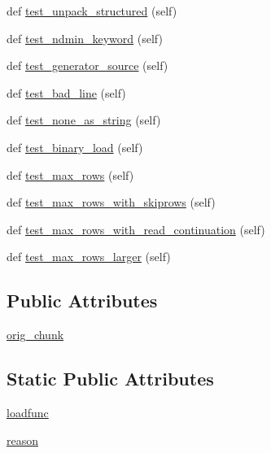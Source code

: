 \begin{DoxyCompactItemize}
\item 
def \hyperlink{classnumpy_1_1lib_1_1tests_1_1test__io_1_1TestLoadTxt_a16a39f122d202375a85138547c5bed27}{test\+\_\+unpack\+\_\+structured} (self)
\item 
def \hyperlink{classnumpy_1_1lib_1_1tests_1_1test__io_1_1TestLoadTxt_a3bf64793505e6c2caabbe46dced10c78}{test\+\_\+ndmin\+\_\+keyword} (self)
\item 
def \hyperlink{classnumpy_1_1lib_1_1tests_1_1test__io_1_1TestLoadTxt_a20a293919a71ebebbc4afced0261344f}{test\+\_\+generator\+\_\+source} (self)
\item 
def \hyperlink{classnumpy_1_1lib_1_1tests_1_1test__io_1_1TestLoadTxt_aae505bab6b100255e53b8520cf0c5a47}{test\+\_\+bad\+\_\+line} (self)
\item 
def \hyperlink{classnumpy_1_1lib_1_1tests_1_1test__io_1_1TestLoadTxt_ab2c3b9e38ecee2c6b18475986295a916}{test\+\_\+none\+\_\+as\+\_\+string} (self)
\item 
def \hyperlink{classnumpy_1_1lib_1_1tests_1_1test__io_1_1TestLoadTxt_a8e3459c741792d56e280295972697d3d}{test\+\_\+binary\+\_\+load} (self)
\item 
def \hyperlink{classnumpy_1_1lib_1_1tests_1_1test__io_1_1TestLoadTxt_a5f9db798413530df8dacf6ec4dae39ab}{test\+\_\+max\+\_\+rows} (self)
\item 
def \hyperlink{classnumpy_1_1lib_1_1tests_1_1test__io_1_1TestLoadTxt_aff6efdfa274eadf11bc1a1f76ee28e09}{test\+\_\+max\+\_\+rows\+\_\+with\+\_\+skiprows} (self)
\item 
def \hyperlink{classnumpy_1_1lib_1_1tests_1_1test__io_1_1TestLoadTxt_a106e93b25997699ad8e59d8d9d68dbd5}{test\+\_\+max\+\_\+rows\+\_\+with\+\_\+read\+\_\+continuation} (self)
\item 
def \hyperlink{classnumpy_1_1lib_1_1tests_1_1test__io_1_1TestLoadTxt_a6f18ae9590cdbc2252ab5f05425750c9}{test\+\_\+max\+\_\+rows\+\_\+larger} (self)
\end{DoxyCompactItemize}
\subsection*{Public Attributes}
\begin{DoxyCompactItemize}
\item 
\hyperlink{classnumpy_1_1lib_1_1tests_1_1test__io_1_1TestLoadTxt_a05eb4bfd44fcf998aa543b68b7ba4432}{orig\+\_\+chunk}
\end{DoxyCompactItemize}
\subsection*{Static Public Attributes}
\begin{DoxyCompactItemize}
\item 
\hyperlink{classnumpy_1_1lib_1_1tests_1_1test__io_1_1TestLoadTxt_ad82a137b50fa28eba14a960c50b18e05}{loadfunc}
\item 
\hyperlink{classnumpy_1_1lib_1_1tests_1_1test__io_1_1TestLoadTxt_a55aad472e863836036f50673c55c533d}{reason}
\end{DoxyCompactItemize}


